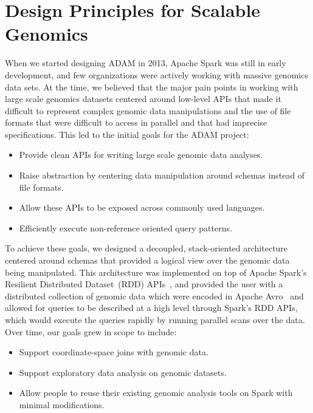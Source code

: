 \documentclass[phd]{ucbthesis}
\begin{document}
\chapter{Design Principles for Scalable Genomics}
\label{chap:design}

When we started designing {ADAM} in 2013, {Apache Spark} was still
in early development, and few organizations were actively working with massive
genomics data sets. At the time, we believed that the major pain points in
working with large scale genomics datasets centered around low-level APIs that
made it difficult to represent complex genomic data manipulations and the use of
file formats that were difficult to access in parallel and that had imprecise
specifications. This led to the initial goals for the {ADAM} project:

\begin{itemize}
\item Provide clean APIs for writing large scale genomic data analyses.
\item Raise abstraction by centering data manipulation around schemas instead
  of file formats.
\item Allow these APIs to be exposed across commonly used languages.
\item Efficiently execute non-reference oriented query patterns.
\end{itemize}

To achieve these goals, we designed a decoupled, stack-oriented architecture
centered around schemas that provided a logical view over the genomic
data being manipulated. This architecture was implemented on top of
{Apache Spark}'s Resilient Distributed Dataset~(RDD) APIs~\cite{zaharia12},
and provided the user with a distributed collection of genomic data which were
encoded in {Apache Avro}~\cite{avro} and allowed for queries to be described at a high level
through {Spark}'s RDD APIs, which would execute the queries rapidly by
running parallel scans over the data. Over time, our goals grew in scope to
include:

\begin{itemize}
\item Support coordinate-space joins with genomic data.
\item Support exploratory data analysis on genomic datasets.
\item Allow people to reuse their existing genomic analysis tools on Spark with
  minimal modifications.
\end{itemize}
\end{document}
